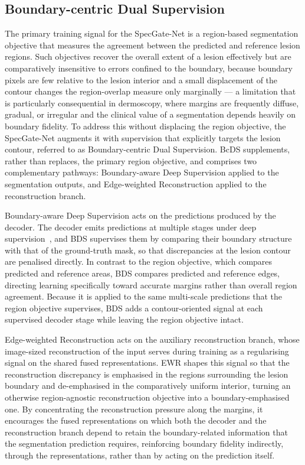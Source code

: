 \subsection{Boundary-centric Dual Supervision}
\label{subsec:bcds}

The primary training signal for the SpecGate-Net is a region-based segmentation objective that measures the agreement between the predicted and reference lesion regions. Such objectives recover the overall extent of a lesion effectively but are comparatively insensitive to errors confined to the boundary, because boundary pixels are few relative to the lesion interior and a small displacement of the contour changes the region-overlap measure only marginally --- a limitation that is particularly consequential in dermoscopy, where margins are frequently diffuse, gradual, or irregular and the clinical value of a segmentation depends heavily on boundary fidelity. To address this without displacing the region objective, the SpecGate-Net augments it with supervision that explicitly targets the lesion contour, referred to as Boundary-centric Dual Supervision. BcDS supplements, rather than replaces, the primary region objective, and comprises two complementary pathways: Boundary-aware Deep Supervision applied to the segmentation outputs, and Edge-weighted Reconstruction applied to the reconstruction branch.

Boundary-aware Deep Supervision acts on the predictions produced by the decoder. The decoder emits predictions at multiple stages under deep supervision~\cite{ref32}, and BDS supervises them by comparing their boundary structure with that of the ground-truth mask, so that discrepancies at the lesion contour are penalised directly. In contrast to the region objective, which compares predicted and reference areas, BDS compares predicted and reference edges, directing learning specifically toward accurate margins rather than overall region agreement. Because it is applied to the same multi-scale predictions that the region objective supervises, BDS adds a contour-oriented signal at each supervised decoder stage while leaving the region objective intact.

Edge-weighted Reconstruction acts on the auxiliary reconstruction branch, whose image-sized reconstruction of the input serves during training as a regularising signal on the shared fused representations. EWR shapes this signal so that the reconstruction discrepancy is emphasised in the regions surrounding the lesion boundary and de-emphasised in the comparatively uniform interior, turning an otherwise region-agnostic reconstruction objective into a boundary-emphasised one. By concentrating the reconstruction pressure along the margins, it encourages the fused representations on which both the decoder and the reconstruction branch depend to retain the boundary-related information that the segmentation prediction requires, reinforcing boundary fidelity indirectly, through the representations, rather than by acting on the prediction itself.

